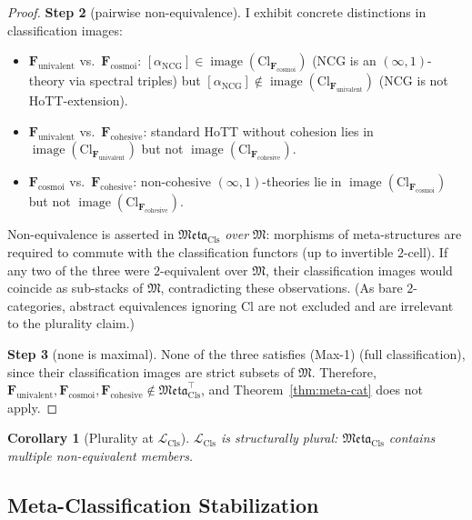 \documentclass[11pt]{article}
\theoremstyle{plain}
\newtheorem{corollary}[theorem]{Corollary}
\theoremstyle{definition}
\newcommand{\fM}{\mathfrak{M}}
\newcommand{\Meta}{\mathfrak{Meta}}
\newcommand{\LCls}{\mathcal{L}_{\mathrm{Cls}}}
\newcommand{\Cl}{\mathrm{Cl}}
\DeclareMathOperator{\image}{image}
\begin{document}
\begin{proof}
\textbf{Step 2} (pairwise non-equivalence). I exhibit concrete distinctions in classification images:
\begin{itemize}
\item $\mathbf{F}_{\mathrm{univalent}}$ vs.\ $\mathbf{F}_{\mathrm{cosmoi}}$: $[\alpha_{\mathrm{NCG}}] \in \image(\Cl_{\mathbf{F}_{\mathrm{cosmoi}}})$ (NCG is an $(\infty, 1)$-theory via spectral triples) but $[\alpha_{\mathrm{NCG}}] \notin \image(\Cl_{\mathbf{F}_{\mathrm{univalent}}})$ (NCG is not HoTT-extension).
\item $\mathbf{F}_{\mathrm{univalent}}$ vs.\ $\mathbf{F}_{\mathrm{cohesive}}$: standard HoTT without cohesion lies in $\image(\Cl_{\mathbf{F}_{\mathrm{univalent}}})$ but not $\image(\Cl_{\mathbf{F}_{\mathrm{cohesive}}})$.
\item $\mathbf{F}_{\mathrm{cosmoi}}$ vs.\ $\mathbf{F}_{\mathrm{cohesive}}$: non-cohesive $(\infty, 1)$-theories lie in $\image(\Cl_{\mathbf{F}_{\mathrm{cosmoi}}})$ but not $\image(\Cl_{\mathbf{F}_{\mathrm{cohesive}}})$.
\end{itemize}
Non-equivalence is asserted in $\Meta_{\mathrm{Cls}}$ \emph{over} $\fM$: morphisms of meta-structures are required to commute with the classification functors (up to invertible $2$-cell). If any two of the three were $2$-equivalent over $\fM$, their classification images would coincide as sub-stacks of $\fM$, contradicting these observations. (As bare $2$-categories, abstract equivalences ignoring $\Cl$ are not excluded and are irrelevant to the plurality claim.)

\textbf{Step 3} (none is maximal). None of the three satisfies (Max-1) (full classification), since their classification images are strict subsets of $\fM$. Therefore, $\mathbf{F}_{\mathrm{univalent}}, \mathbf{F}_{\mathrm{cosmoi}}, \mathbf{F}_{\mathrm{cohesive}} \notin \Meta_{\mathrm{Cls}}^{\top}$, and Theorem~\ref{thm:meta-cat} does not apply.
\end{proof}

\begin{corollary}[Plurality at $\LCls$]\label{cor:plurality}
$\LCls$ is structurally plural: $\Meta_{\mathrm{Cls}}$ contains multiple non-equivalent members.
\end{corollary}

\subsection{Meta-Classification Stabilization}
\end{document}
